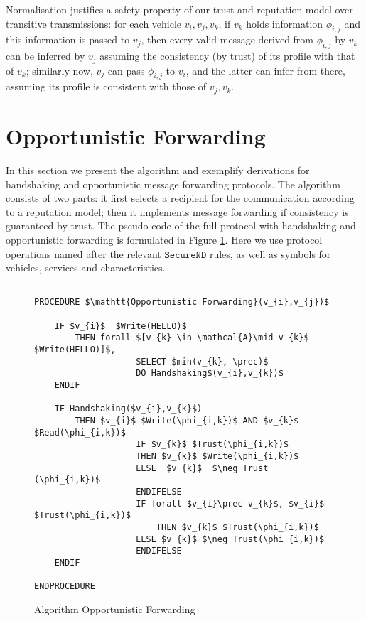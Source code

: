\documentclass[compsoc, conference, letterpaper, 10pt, times]{IEEEtran}
\begin{document}
Normalisation justifies a safety property of our trust and reputation model over transitive transmissions: for each vehicle $v_{i}, v_{j}, v_{k}$, if $v_{k}$ holds information $\phi_{i,j}$ and this information is passed to $v_{j}$, then every valid message derived from $\phi_{i,j}$ by $v_{k}$ can be inferred by $v_{j}$ assuming the consistency (by trust) of its profile with that of $v_{k}$; similarly now, $v_{j}$ can pass $\phi_{i,j}$ to $v_{i}$, and the latter can infer from there, assuming its profile is consistent with those of $v_{j}, v_{k}$.



\section{Opportunistic Forwarding}\label{sec:opportunistic}



In this section we present the algorithm and exemplify derivations for handshaking and opportunistic message forwarding protocols. The algorithm consists of two parts: it first selects a recipient for the communication according to a reputation model; then it implements message forwarding if consistency is guaranteed by trust. The pseudo-code of the full protocol with handshaking and opportunistic forwarding is formulated in Figure \ref{fig:routine1}. Here we use protocol operations named after the relevant $\mathtt{SecureND}$ rules, as well as symbols for vehicles, services and characteristics.


\begin{figure}[t]
	\lstset{language=Java,
		basicstyle=\scriptsize,
		mathescape}
%	
	\begin{lstlisting}[frame=single]  % Start your code-block
	
PROCEDURE $\mathtt{Opportunistic Forwarding}(v_{i},v_{j})$
	
	IF $v_{i}$  $Write(HELLO)$ 
	    THEN forall $[v_{k} \in \mathcal{A}\mid v_{k}$ $Write(HELLO)]$, 
					SELECT $min(v_{k}, \prec)$
					DO Handshaking$(v_{i},v_{k})$
	ENDIF
			
	IF Handshaking($v_{i},v_{k}$)
		THEN $v_{i}$ $Write(\phi_{i,k})$ AND $v_{k}$ $Read(\phi_{i,k})$ 
					IF $v_{k}$ $Trust(\phi_{i,k})$
					THEN $v_{k}$ $Write(\phi_{i,k})$
					ELSE  $v_{k}$  $\neg Trust (\phi_{i,k})$
					ENDIFELSE
					IF forall $v_{i}\prec v_{k}$, $v_{i}$ $Trust(\phi_{i,k})$
						THEN $v_{k}$ $Trust(\phi_{i,k})$
					ELSE $v_{k}$ $\neg Trust(\phi_{i,k})$
					ENDIFELSE
	ENDIF
				
ENDPROCEDURE
	\end{lstlisting}
	\caption{Algorithm Opportunistic Forwarding}\label{fig:routine1}
\end{figure}
\end{document}
